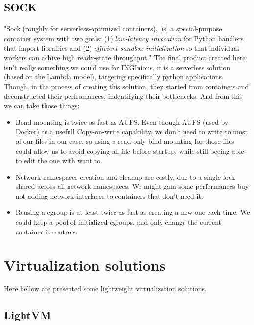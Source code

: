 \subsection{SOCK} \label{subsec-sock}
\paragraph{}"Sock (roughly for serverless-optimized containers), [is] a special-purpose container system with two goals: (1) \textit{low-latency invocation} for Python handlers that import librairies and (2) \textit{efficient sandbox initialization} so that individual workers can achive high ready-state throughput." \cite{oakes2018sock}  The final product created here isn't really something we could use for INGInious, it is a serverless solution (based on the Lambda model), targeting specifically python applications.  Though, in the process of creating this solution, they started from containers and deconstructed their perfromances, indentifying their bottlenecks.  And from this we can take those things:
\begin{itemize}
\renewcommand\labelitemi{--}
  \item Bond mounting is twice as fast as AUFS.  Even though AUFS (used by Docker) as a usefull Copy-on-write capability, we don't need to write to most of our files in our case, so using a read-only bind mounting for those files could allow us to avoid copying all file before startup, while still beeing able to edit the one with want to.
  \item Network namespaces creation and cleanup are costly, due to a single lock shared across all network namespaces.  We might gain some performances buy not adding network interfaces to containers that don't need it.
  \item Reusing a cgroup is at least twice as fast as creating a new one each time.  We could keep a pool of initialized cgroups, and only change the current container it controls.
\end{itemize}

\section{Virtualization solutions}

Here bellow are presented some lightweight virtualization solutions.

\subsection{LightVM} 
